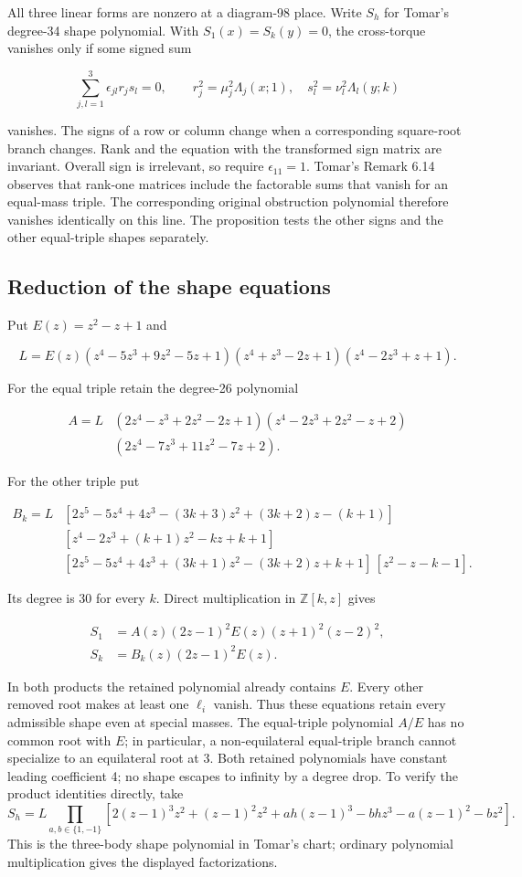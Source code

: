 \documentclass[11pt,letterpaper]{article}
\theoremstyle{definition}
\begin{document}
All three linear forms are nonzero at a diagram-98 place. Write \(S_h\) for Tomar's degree-34 shape polynomial. With \(S_1(x)=S_k(y)=0\), the cross-torque vanishes only if some signed sum

\[
\sum_{j,l=1}^{3}\epsilon_{jl} r_j s_l = 0,\qquad
r_j^2=\mu_j^2\Lambda_j(x;1),\quad
s_l^2=\nu_l^2\Lambda_l(y;k)
\]

vanishes. The signs of a row or column change when a corresponding square-root branch changes. Rank and the equation with the transformed sign matrix are invariant. Overall sign is irrelevant, so require \(\epsilon_{11}=1\). Tomar's Remark 6.14 observes that rank-one matrices include the factorable sums that vanish for an equal-mass triple. The corresponding original obstruction polynomial therefore vanishes identically on this line. The proposition tests the other signs and the other equal-triple shapes separately.

\subsection*{Reduction of the shape equations}

Put \(E(z)=z^2-z+1\) and

\[
L=E(z)(z^4-5z^3+9z^2-5z+1)(z^4+z^3-2z+1)(z^4-2z^3+z+1).
\]

For the equal triple retain the degree-26 polynomial

\[
\begin{aligned}A=L{}&(2z^4-z^3+2z^2-2z+1)(z^4-2z^3+2z^2-z+2)\\
&(2z^4-7z^3+11z^2-7z+2).\end{aligned}
\]

For the other triple put

\[
\begin{aligned}
B_k=L{}&[2z^5-5z^4+4z^3-(3k+3)z^2+(3k+2)z-(k+1)]\\
&[z^4-2z^3+(k+1)z^2-kz+k+1]\\
&[2z^5-5z^4+4z^3+(3k+1)z^2-(3k+2)z+k+1]\,
[z^2-z-k-1].
\end{aligned}
\]

Its degree is 30 for every \(k\). Direct multiplication in \(\mathbb Z[k,z]\) gives

\[
\begin{aligned}S_1&=A(z)(2z-1)^2 E(z)(z+1)^2(z-2)^2,\\
S_k&=B_k(z)(2z-1)^2 E(z).\end{aligned}
\]

In both products the retained polynomial already contains \(E\). Every other removed root makes at least one \(\ell_i\) vanish. Thus these equations retain every admissible shape even at special masses. The equal-triple polynomial \(A/E\) has no common root with \(E\); in particular, a non-equilateral equal-triple branch cannot specialize to an equilateral root at 3. Both retained polynomials have constant leading coefficient 4; no shape escapes to infinity by a degree drop. To verify the product identities directly, take
\[
 S_h=L\prod_{a,b\in\{1,-1\}}
 [2(z-1)^3z^2+(z-1)^2z^2+ah(z-1)^3-bhz^3-a(z-1)^2-bz^2].
\]
This is the three-body shape polynomial in Tomar's chart; ordinary polynomial multiplication gives the displayed factorizations.
\end{document}
